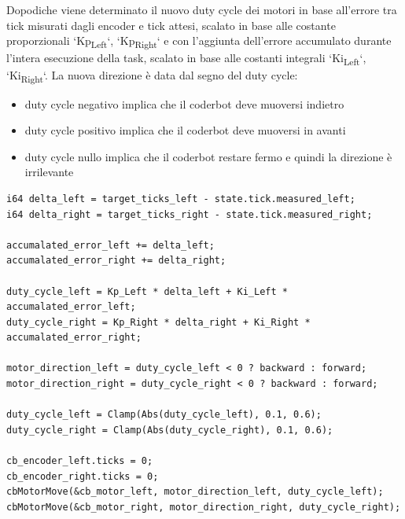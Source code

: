 \documentclass[11pt]{article}
\begin{document}
Dopodiche viene determinato il nuovo duty cycle dei motori in base all'errore tra tick misurati dagli encoder e tick attesi, scalato in base alle costante proporzionali `Kp\textsubscript{Left}`, `Kp\textsubscript{Right}` e con l'aggiunta dell'errore accumulato durante l'intera esecuzione della task, scalato in base alle costanti integrali `Ki\textsubscript{Left}`, `Ki\textsubscript{Right}`.
La nuova direzione è data dal segno del duty cycle:
\begin{itemize}
\item duty cycle negativo implica che il coderbot deve muoversi indietro
\item duty cycle positivo implica che il coderbot deve muoversi in avanti
\item duty cycle nullo implica che il coderbot restare fermo e quindi la direzione è irrilevante
\end{itemize}
\begin{verbatim}
i64 delta_left = target_ticks_left - state.tick.measured_left;
i64 delta_right = target_ticks_right - state.tick.measured_right;

accumalated_error_left += delta_left;
accumalated_error_right += delta_right;

duty_cycle_left = Kp_Left * delta_left + Ki_Left * accumalated_error_left;
duty_cycle_right = Kp_Right * delta_right + Ki_Right * accumalated_error_right;

motor_direction_left = duty_cycle_left < 0 ? backward : forward;
motor_direction_right = duty_cycle_right < 0 ? backward : forward;

duty_cycle_left = Clamp(Abs(duty_cycle_left), 0.1, 0.6);
duty_cycle_right = Clamp(Abs(duty_cycle_right), 0.1, 0.6);

cb_encoder_left.ticks = 0;
cb_encoder_right.ticks = 0;
cbMotorMove(&cb_motor_left, motor_direction_left, duty_cycle_left);
cbMotorMove(&cb_motor_right, motor_direction_right, duty_cycle_right);
\end{verbatim}
\end{document}
